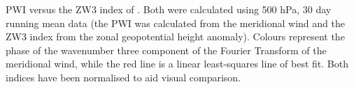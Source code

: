 \label{fig:metric_vs_zw3}
PWI versus the ZW3 index of \citet{Raphael2004}. Both were calculated using 500 hPa, 30 day running mean data (the PWI was calculated from the meridional wind and the ZW3 index from the zonal geopotential height anomaly). Colours represent the phase of the wavenumber three component of the Fourier Transform of the meridional wind, while the red line is a linear least-squares line of best fit. Both indices have been normalised to aid visual comparison.